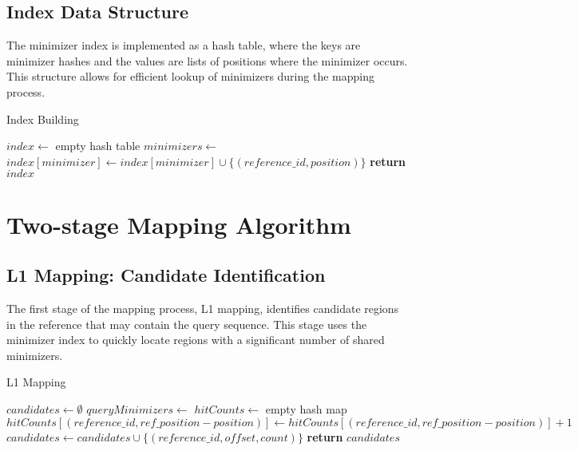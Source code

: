 \documentclass{article}
\begin{document}
\subsection{Index Data Structure}

The minimizer index is implemented as a hash table, where the keys are minimizer hashes and the values are lists of positions where the minimizer occurs. This structure allows for efficient lookup of minimizers during the mapping process.

\begin{algorithm}
\caption{Index Building}
\begin{algorithmic}[1]
\State $index \gets$ empty hash table
    \State $minimizers \gets$ 
        \State $index[minimizer] \gets index[minimizer] \cup \{(reference\_id, position)\}$
    \EndFor
\EndFor
\State \textbf{return} $index$
\EndProcedure
\end{algorithmic}
\end{algorithm}

\section{Two-stage Mapping Algorithm}

\subsection{L1 Mapping: Candidate Identification}

The first stage of the mapping process, L1 mapping, identifies candidate regions in the reference that may contain the query sequence. This stage uses the minimizer index to quickly locate regions with a significant number of shared minimizers.

\begin{algorithm}
\caption{L1 Mapping}
\begin{algorithmic}[1]
\State $candidates \gets \emptyset$
\State $queryMinimizers \gets$ 
\State $hitCounts \gets$ empty hash map
            \State $hitCounts[(reference\_id, ref\_position - position)] \gets hitCounts[(reference\_id, ref\_position - position)] + 1$
        \EndFor
    \EndIf
\EndFor
{}
        \State $candidates \gets candidates \cup \{(reference\_id, offset, count)\}$
    \EndIf
\EndFor
\State \textbf{return} $candidates$
\EndProcedure
\end{algorithmic}
\end{algorithm}
\end{document}
